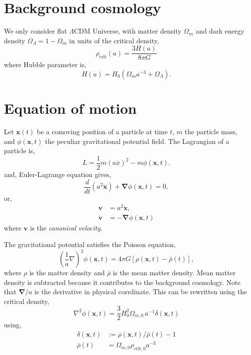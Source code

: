 \documentclass[a4paper]{article}
\begin{document}
\section{Background cosmology}

We only consider flat $\Lambda$CDM Universe, with matter density
$\Omega_m$ and dark energy density $\Omega_\Lambda = 1 - \Omega_m$ in units of the critical density,
\begin{equation}
  \rho_\mathrm{crit}(a) = \frac{3H(a)}{8\pi G}
\end{equation}
where Hubble parameter is,
\begin{equation}
  H(a) = H_0 \left( \Omega_m a^{-3} + \Omega_\Lambda \right).
\end{equation}

\section{Equation of motion}
Let $\bm{x}(t)$ be a comoving position of a particle at time $t$, $m$
the particle mass, and $\phi(\bm{x}, t)$ the peculiar gravitational
potential field. The Lagrangian of a particle is,
\begin{equation}
  L= \frac{1}{2} m (a\dot{x})^2 - m \phi(\bm{x}, t).
\end{equation}
and, Euler-Lagrange equation gives,
\begin{equation}
  \label{eq:motion}
  \frac{d}{dt}(a^2 \dot{\bm{x}}) + \bm{\nabla} \phi(\bm{x}, t) = 0,
\end{equation}
or,
\begin{align}
  \bm{v} &= a^2 \dot{\bm{x}},\\
  \dot{\bm{v}} &= - \bm{\nabla} \phi(\bm{x}, t)
\end{align}
where $\bm{v}$ is the \textit{canonical velocity}. 


The gravitational potential satisfies the Poisson equation,
\begin{equation}
  \left( \frac{1}{a} \nabla \right)^2 \phi(\bm{x}, t)
    = 4\pi G \left[ \rho(\bm{x}, t) - \bar{\rho}(t) \right],
\end{equation}
where $\rho$ is the matter density and $\bar{\rho}$ is the mean matter
density. Mean matter density is subtracted because it contributes to the background cosmology. Note that $\bm{\nabla}/a$ is the derivative in physical
corrdinate. This can be rewritten using the critical density,
\begin{equation}
  \label{eq:poisson2}
  \nabla^2 \phi(\bm{x}, t) =
  \frac{3}{2} H_0^2 \Omega_{m,0} \, a^{-1} \delta(\bm{x}, t)
\end{equation}
using,
\begin{align}
  \delta(\bm{x}, t) &:= \rho(\bm{x}, t)/\bar{\rho}(t) - 1 \\
  \bar{\rho}(t)     &= \Omega_{m,0} \rho_{\mathrm{crit},0} a^{-3}
\end{align}
\end{document}
